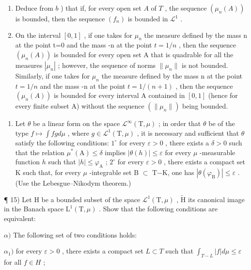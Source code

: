 \begin{enumerate}
\def\labelenumi{\alph{enumi})}
\setcounter{enumi}{2}
\item
  Deduce from \(b\) ) that if, for every open set \(A\) of \(T\) , the sequence \((\mu_n(A))\) is bounded, then the sequence \((f_n)\) is bounded in \(\mathcal{L}^1\) .
\item
  On the interval \([0,1]\) , if one takes for \(\mu_{n}\) the measure defined by the mass n at the point t=0 and the mass -n at the point \(t=1/n\) , then the sequence \((\mu_{n}(A))\) is bounded for every open set A that is quadrable for all the measures \(|\mu_{n}|\) ; however, the sequence of norms \(\|\mu_{n}\|\) is not bounded. Similarly, if one takes for \(\mu_{n}\) the measure defined by the mass n at the point \(t=1/n\) and the mass -n at the point \(t=1/(n+1)\) , then the sequence \((\mu_{n}(A))\) is bounded for every interval A contained in \([0,1]\) (hence for every finite subset A) without the sequence \((\|\mu_{n}\|)\) being bounded.
\end{enumerate}

\begin{enumerate}
\def\labelenumi{\arabic{enumi})}
\setcounter{enumi}{13}
\tightlist
\item
  Let \(\theta\) be a linear form on the space \(\mathcal{L}^{\infty}(\mathrm{T},\mu)\) ; in order that \(\theta\) be of the type \(f\mapsto\int fg d\mu\) , where \(g\in\mathcal{L}^{1}(\mathrm{T},\mu)\) , it is necessary and sufficient that \(\theta\) satisfy the following conditions: \(1^{\circ}\) for every \(\varepsilon>0\) , there exists a \(\delta>0\) such that the relation \(\mu^{*}(\mathrm{A})\leqslant\delta\) implies \(|\theta(h)|\leqslant\varepsilon\) for every \(\mu\) -measurable function \(h\) such that \(|h|\leqslant\varphi_{\mathrm{A}}\) ; \(2^{\circ}\) for every \(\varepsilon>0\) , there exists a compact set K such that, for every \(\mu\) -integrable set B \(\subset\) T−K, one has \(|\theta(\varphi_{\mathrm{B}})|\leqslant\varepsilon\) . (Use the Lebesgue--Nikodym theorem.)
\end{enumerate}

¶ 15) Let H be a bounded subset of the space \(\mathcal{L}^1 (\mathrm{T},\mu)\) , \(\widetilde{\mathrm{H}}\) its canonical image in the Banach space \(\mathrm{L}^1 (\mathrm{T},\mu)\) . Show that the following conditions are equivalent:

\(\alpha)\) The following set of two conditions holds:

\(\alpha_{1})\) for every \(\varepsilon > 0\) , there exists a compact set \(L \subset T\) such that \(\int_{T - L} |f| d\mu \leqslant \varepsilon\) for all \(f \in H\) ;

